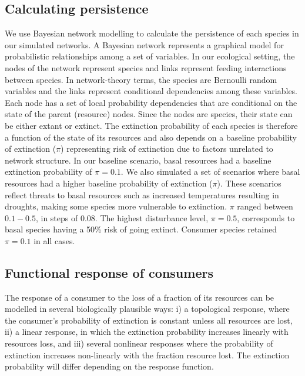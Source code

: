 \documentclass[12pt]{article}
\begin{document}
\begin{spacing}{2.0}
\clearpage        

        
\section{Calculating persistence}        

        We use Bayesian network modelling to calculate the persistence of each species in our simulated networks. 
        A Bayesian network represents a graphical model for probabilistic relationships among a set of variables. 
        In our ecological setting, the nodes of the network represent species and links represent feeding interactions between species.
        In network-theory terms, the species are Bernoulli random variables and the links represent conditional dependencies among these variables. 
        Each node has a set of local probability dependencies that are conditional on the state of the parent (resource) nodes. 
        Since the nodes are species, their state can be either extant or extinct.
        The extinction probability of each species is therefore a function of the state of its resources and also depends on a baseline probability of extinction ($\pi$) representing risk of extinction due to factors unrelated to network structure.
        In our baseline scenario, basal resources had a baseline extinction probability of $\pi = 0.1$. 
        We also simulated a set of scenarios where basal resources had a higher baseline probability of extinction ($\pi$). 
        These scenarios reflect threats to basal resources such as increased temperatures resulting in droughts, making some species more vulnerable to extinction.
        $\pi$ ranged between $0.1-0.5$, in steps of $0.08$. 
        The highest disturbance level, $\pi = 0.5$, corresponds to basal species having a 50\% risk of going extinct. 
        Consumer species retained $\pi=0.1$ in all cases.


    \subsection{Functional response of consumers}

        The response of a consumer to the loss of a fraction of its resources can be modelled in several biologically plausible ways: i) a topological response, where the consumer's probability of extinction is constant unless all resources are lost, ii) a linear response, in which the extinction probability increases linearly with resources loss, and iii) several nonlinear responses where the probability of extinction increases non-linearly with the fraction resource lost. 
        The extinction probability will differ depending on the response function.
        

\end{spacing}
\end{document}
